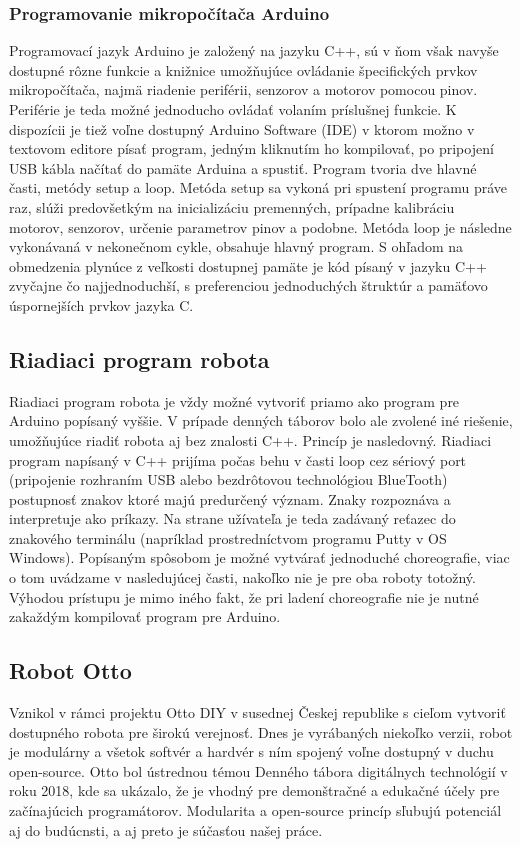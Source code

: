 \subsubsection{Programovanie mikropočítača Arduino}
Programovací jazyk Arduino je založený na jazyku C++, sú v ňom však navyše dostupné rôzne funkcie a knižnice umožňujúce ovládanie špecifických prvkov mikropočítača, najmä riadenie periférii, senzorov a motorov pomocou pinov. \cite{ArduinoLanguage} Periférie je teda možné jednoducho ovládať volaním príslušnej funkcie. K dispozícii je tiež voľne dostupný Arduino Software (IDE) v ktorom možno v textovom editore písať program, jedným kliknutím ho kompilovať, po pripojení USB kábla načítať do pamäte Arduina a spustiť. Program tvoria dve hlavné časti, metódy setup a loop. Metóda setup sa vykoná pri spustení programu práve raz, slúži predovšetkým na  inicializáciu premenných, prípadne kalibráciu motorov, senzorov, určenie parametrov pinov a podobne. Metóda loop je následne vykonávaná v nekonečnom cykle, obsahuje hlavný program. S ohľadom na obmedzenia plynúce z veľkosti dostupnej pamäte je kód písaný v jazyku C++ zvyčajne čo najjednoduchší, s preferenciou jednoduchých štruktúr a pamäťovo úspornejších prvkov jazyka C.

\subsection{Riadiaci program robota}
Riadiaci program robota je vždy možné vytvoriť priamo ako program pre Arduino popísaný vyššie. V prípade denných táborov bolo ale zvolené iné riešenie, umožňujúce riadiť robota aj bez znalosti C++. Princíp je nasledovný. Riadiaci program napísaný v C++ prijíma počas behu v časti loop cez sériový port (pripojenie rozhraním USB alebo bezdrôtovou technológiou BlueTooth) postupnosť znakov ktoré majú predurčený význam. Znaky rozpoznáva a interpretuje ako príkazy. Na strane užívateľa je teda zadávaný reťazec do znakového terminálu (napríklad prostredníctvom programu Putty v OS Windows). Popísaným spôsobom je možné vytvárať jednoduché choreografie, viac o tom uvádzame v nasledujúcej časti, nakoľko nie je pre oba roboty totožný. Výhodou prístupu je mimo iného fakt, že pri ladení choreografie nie je nutné zakaždým kompilovať program pre Arduino. 


\subsection{Robot Otto}
Vznikol v rámci projektu Otto DIY v susednej Českej republike s cieľom vytvoriť dostupného robota pre širokú verejnosť. Dnes je vyrábaných niekoľko verzii, robot je modulárny a všetok softvér a hardvér s ním spojený voľne dostupný v duchu open-source. \cite{OttoDIY} Otto bol ústrednou témou Denného tábora digitálnych technológií v roku 2018, kde sa ukázalo, že je vhodný pre demonštračné a edukačné účely pre začínajúcich programátorov. Modularita a open-source princíp sľubujú potenciál aj do budúcnsti, a aj preto je súčasťou našej práce.

